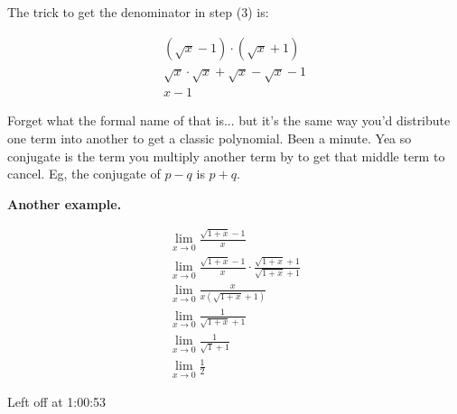 \documentclass{article}
\begin{document}
\begin{enumerate}
The trick to get the denominator in step (3) is:

\begin{align*}
    (\sqrt{x} - 1) \cdot (\sqrt{x} + 1)\\
    \sqrt{x} \cdot \sqrt{x} + \sqrt{x} - \sqrt{x} - 1\\
    x - 1
\end{align*}

Forget what the formal name of that is... but it's the same way you'd distribute one term
into another to get a classic polynomial. Been a minute. Yea so conjugate is the term you
multiply another term by to get that middle term to cancel. Eg, the conjugate of $p-q$ is
$p+q$.

\textbf{Another example.}

\begin{align*}
    \lim_{x \to 0} \frac{\sqrt{1 + x} - 1}{x}\\
    \lim_{x\to 0} \frac{\sqrt{1+x} - 1}{x} \cdot \frac{\sqrt{1+x} + 1}{\sqrt{1+x} + 1}\\
    \lim_{x\to 0} \frac{x}{x(\sqrt{1+x} + 1)}\\
    \lim_{x \to 0} \frac{1}{\sqrt{1 + x} + 1}\\
    \lim_{x\to 0} \frac{1}{\sqrt{1} + 1}\\
    \lim_{x\to 0} \frac{1}{2}
\end{align*}

Left off at 1:00:53

\end{enumerate}
\end{document}
